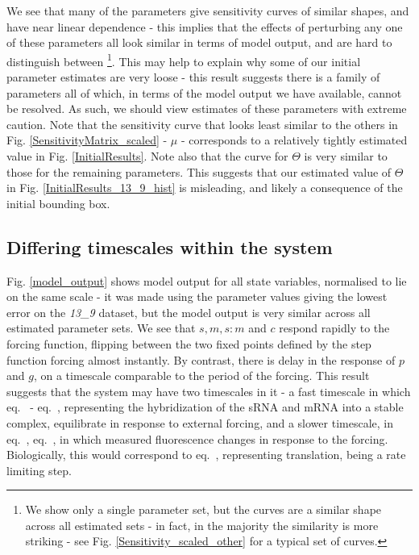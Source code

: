 \documentclass[10pt,journal]{./IEEE_latex_class/IEEEtran}
\renewcommand{\eqref}{eq.~\originaleqref}
\begin{document}
We see that many of the parameters give sensitivity curves of similar shapes, and have near linear dependence - this implies that the effects of perturbing any one of these parameters all look similar in terms of model output, and are hard to distinguish between \footnote{We show only a single parameter set, but the curves are a similar shape across all estimated sets - in fact, in the majority the similarity is more striking - see Fig. \ref{Sensitivity_scaled_other} for a typical set of curves.}. This may help to explain why some of our initial parameter estimates are very loose - this result suggests there is a family of parameters all of which, in terms of the model output we have available, cannot be resolved. As such, we should view estimates of these parameters with extreme caution. Note that the sensitivity curve that looks least similar to the others in Fig. \ref{SensitivityMatrix_scaled} - $\mu$ - corresponds to a relatively tightly estimated value in Fig. \ref{InitialResults}. Note also that the curve for $\Theta$ is very similar to those for the remaining parameters. This suggests that our estimated value of $\Theta$ in Fig. \ref{InitialResults_13_9_hist} is misleading, and likely a consequence of the initial bounding box.

\subsection{Differing timescales within the system}

Fig. \ref{model_output} shows model output for all state variables, normalised to lie on the same scale  - it was made using the parameter values giving the lowest error on the \textit{13\_9} dataset, but the model output is very similar across all estimated parameter sets.
  We see that $s,m,s:m$ and $c$ respond rapidly to the forcing function, flipping between the two fixed points defined by the step function forcing almost instantly. By contrast, there is delay in the response of $p$ and $g$, on a timescale comparable to the period of the forcing. This result suggests that the system may have two timescales in it - a fast timescale in which \eqref{eq:s} - \eqref{eq:c}, representing the hybridization of the sRNA and mRNA into a stable complex, equilibrate in response to external forcing, and a slower timescale, in \eqref{eq:p}, \eqref{eq:g}, in which measured fluorescence changes in response to the forcing. Biologically, this would correspond to \eqref{eq:p}, representing translation, being a rate limiting step.
\end{document}
